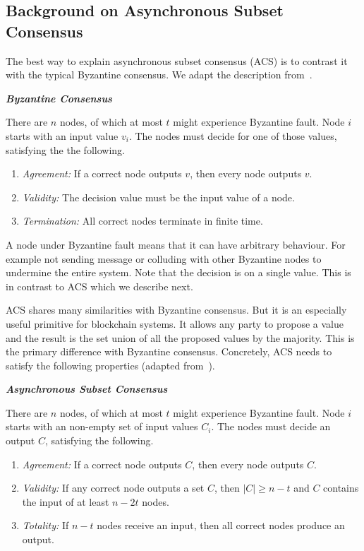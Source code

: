 \subsection{Background on Asynchronous Subset Consensus}
\label{sec:acs-background}

The best way to explain asynchronous subset consensus (ACS) is to contrast it with the typical Byzantine consensus.
We adapt the description from~\cite[Chapter 17]{podc}.
\begin{definition}
\textbf{\emph{Byzantine Consensus}}

There are $n$ nodes, of which at most $t$ might experience Byzantine fault.
Node $i$ starts with an input value $v_i$.
The nodes must decide for one of  those values, satisfying the the following.
\begin{enumerate}
    \item \emph{Agreement:}
        If a correct node outputs $v$, then every node outputs $v$.
    \item \emph{Validity:}
        The decision value must be the input value of a node.
    \item \emph{Termination:}
        All correct nodes terminate in finite time.
\end{enumerate}
\end{definition}
A node under Byzantine fault means that it can have arbitrary behaviour.
For example not sending message or colluding with other Byzantine nodes to undermine the entire system.
Note that the decision is on a single value.
This is in contrast to ACS which we describe next.

ACS shares many similarities with Byzantine consensus.
But it is an especially useful primitive for blockchain systems.
It allows any party to propose a value and the result is the set union of all the proposed values by the majority.
This is the primary difference with Byzantine consensus.
Concretely, ACS needs to satisfy the following properties (adapted from~\cite{miller2016honey}).
\begin{definition}
\label{def:acs}
\textbf{\emph{Asynchronous Subset Consensus}}

There are $n$ nodes, of which at most $t$ might experience Byzantine fault.
Node $i$ starts with an non-empty set of input values $C_i$.
The nodes must decide an output $C$, satisfying the following.
\begin{enumerate}
    \item \emph{Agreement:}
        If a correct node outputs $C$, then every node outputs $C$.
    \item \emph{Validity:}
        If any correct node outputs a set $C$,
        then $|C| \ge n - t$ and $C$ contains the input of at least $n - 2t$ nodes.
    \item \emph{Totality:}
        If $n - t$ nodes receive an input, then all correct nodes produce an output.
\end{enumerate}
\end{definition}


